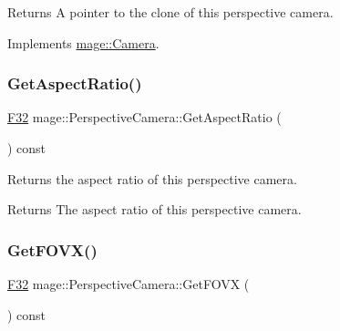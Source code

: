\begin{DoxyReturn}{Returns}
A pointer to the clone of this perspective camera. 
\end{DoxyReturn}


Implements \hyperlink{classmage_1_1_camera_aedf6e7d6ee6c6e9e82da814ef8e705ab}{mage\+::\+Camera}.

\hypertarget{classmage_1_1_perspective_camera_a1d0b6de98514c1fdaf3e1aac4971987b}{}\label{classmage_1_1_perspective_camera_a1d0b6de98514c1fdaf3e1aac4971987b} 
\subsubsection{\texorpdfstring{Get\+Aspect\+Ratio()}{GetAspectRatio()}}
{\footnotesize\ttfamily \hyperlink{namespacemage_aa97e833b45f06d60a0a9c4fc22ae02c0}{F32} mage\+::\+Perspective\+Camera\+::\+Get\+Aspect\+Ratio (\begin{DoxyParamCaption}{ }\end{DoxyParamCaption}) const\hspace{0.3cm}{\ttfamily [noexcept]}}

Returns the aspect ratio of this perspective camera.

\begin{DoxyReturn}{Returns}
The aspect ratio of this perspective camera. 
\end{DoxyReturn}
\hypertarget{classmage_1_1_perspective_camera_a743acc9d0f30986788a548b78ff6d0d0}{}\label{classmage_1_1_perspective_camera_a743acc9d0f30986788a548b78ff6d0d0} 
\subsubsection{\texorpdfstring{Get\+F\+O\+V\+X()}{GetFOVX()}}
{\footnotesize\ttfamily \hyperlink{namespacemage_aa97e833b45f06d60a0a9c4fc22ae02c0}{F32} mage\+::\+Perspective\+Camera\+::\+Get\+F\+O\+VX (\begin{DoxyParamCaption}{ }\end{DoxyParamCaption}) const\hspace{0.3cm}{\ttfamily [noexcept]}}

